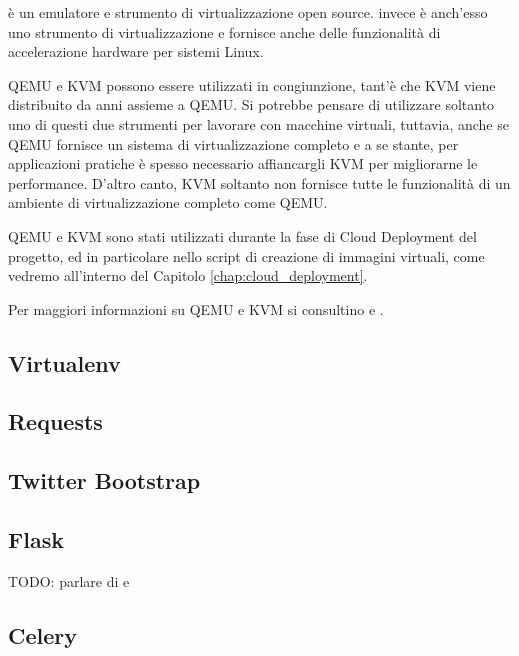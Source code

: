              è un emulatore e strumento di virtualizzazione open source.  invece è anch'esso uno strumento di virtualizzazione e fornisce anche delle funzionalità di accelerazione hardware per sistemi Linux.
            
            \ac{QEMU} e \ac{KVM} possono essere utilizzati in congiunzione, tant'è che \ac{KVM} viene distribuito da anni assieme a \ac{QEMU}. Si potrebbe pensare di utilizzare soltanto uno di questi due strumenti per lavorare con macchine virtuali, tuttavia, anche se \ac{QEMU} fornisce un sistema di virtualizzazione completo e a se stante, per applicazioni pratiche è spesso necessario affiancargli \ac{KVM} per migliorarne le performance. D'altro canto, \ac{KVM} soltanto non fornisce tutte le funzionalità di un ambiente di virtualizzazione completo come \ac{QEMU}.
            
            \ac{QEMU} e \ac{KVM} sono stati utilizzati durante la fase di Cloud Deployment del progetto, ed in particolare nello script di creazione di immagini virtuali, come vedremo all'interno del Capitolo \ref{chap:cloud_deployment}.
            
            Per maggiori informazioni su \ac{QEMU} e \ac{KVM} si consultino \cite{kvm:wiki} e \cite{qemu:wiki}.
            
        \subsection{Virtualenv} \label{subsec:p;sl;virtualenv}
        
        \subsection{Requests} \label{subsec:p;sl;requests}
        
        \subsection{Twitter Bootstrap} \label{subsec:p;sl;twitter_bootstrap}
        
        \subsection{Flask} \label{subsec:p;sl;flask}
        
            TODO: parlare di  e 
        
        \subsection{Celery} \label{subsec:p;sl;celery}
        
